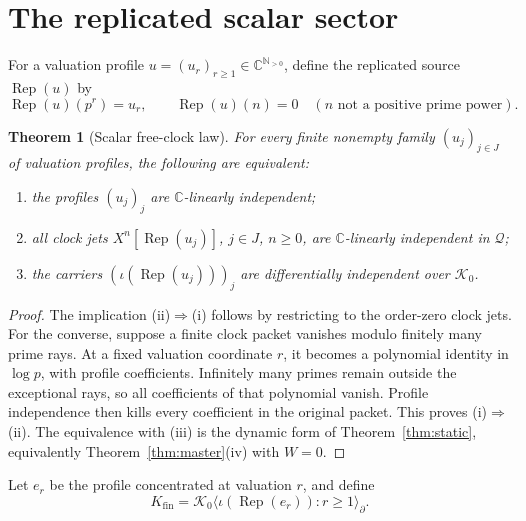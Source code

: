 \documentclass[11pt]{article}
\newtheorem{theorem}{Theorem}[section]
\theoremstyle{definition}
\theoremstyle{remark}
\newcommand{\C}{\mathbb C}
\newcommand{\N}{\mathbb N}
\newcommand{\cK}{\mathcal K}
\newcommand{\cQ}{\mathcal Q}
\newcommand{\diff}{\partial}
\begin{document}
\section{The replicated scalar sector}\label{sec:scalar}

For a valuation profile \(u=(u_r)_{r\geq1}\in\C^{\N_{>0}}\), define the replicated source
\(\operatorname{Rep}(u)\) by
\begin{equation}\label{eq:replication}
  \operatorname{Rep}(u)(p^r)=u_r,
  \qquad
  \operatorname{Rep}(u)(n)=0\quad(n\text{ not a positive prime power}).
\end{equation}

\begin{theorem}[Scalar free-clock law]\label{thm:scalar-free}
For every finite nonempty family \((u_j)_{j\in J}\) of valuation profiles, the following are
equivalent:
\begin{enumerate}[label=\textup{(\roman*)},leftmargin=2.5em]
  \item the profiles \((u_j)_j\) are \(\C\)-linearly independent;
  \item all clock jets \(X^n[\operatorname{Rep}(u_j)]\), \(j\in J\), \(n\geq0\), are
  \(\C\)-linearly independent in \(\cQ\);
  \item the carriers \((\iota(\operatorname{Rep}(u_j)))_j\) are differentially independent
  over \(\cK_0\).
\end{enumerate}
\end{theorem}

\begin{proof}
The implication (ii)\(\Rightarrow\)(i) follows by restricting to the order-zero clock jets.
For the converse, suppose a finite clock packet vanishes modulo finitely many prime rays.  At a
fixed valuation coordinate \(r\), it becomes a polynomial identity in \(\log p\), with profile
coefficients.  Infinitely many primes remain outside the exceptional rays, so all coefficients of
that polynomial vanish.  Profile independence then kills every coefficient in the original
packet.  This proves (i)\(\Rightarrow\)(ii).  The equivalence with (iii) is the dynamic form of
Theorem~\ref{thm:static}, equivalently Theorem~\ref{thm:master}(iv) with \(W=0\).
\end{proof}

Let \(e_r\) be the profile concentrated at valuation \(r\), and define
\begin{equation}\label{eq:Kfin-formal}
  K_{\mathrm{fin}}=
  \cK_0\langle\iota(\operatorname{Rep}(e_r)):r\geq1\rangle_{\diff}.
\end{equation}
\end{document}
